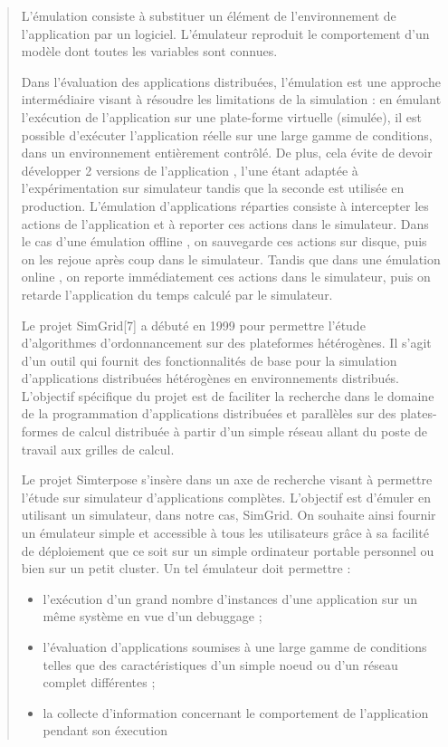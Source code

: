 \documentclass{article}
\begin{document}
\begin{quotation}
L’émulation consiste à substituer un élément de l’environnement de l’application
par un logiciel. L’émulateur reproduit le comportement d’un modèle dont toutes
les variables sont connues.

Dans l’évaluation des applications distribuées, l’émulation est une approche
intermédiaire visant à résoudre les limitations de la simulation : {\color{red}
  en émulant l’exécution de l’application sur une plate-forme virtuelle
  (simulée), il est possible d’exécuter l’application réelle sur une large gamme
  de conditions, dans un environnement entièrement contrôlé.} De plus, cela
évite de devoir développer 2 versions de l’application , l’une étant adaptée à
l’expérimentation sur simulateur tandis que la seconde est utilisée en
production. L’émulation d’applications réparties consiste à intercepter les
actions de l’application et à reporter ces actions dans le simulateur.  Dans le
cas d’une émulation offline , on sauvegarde ces actions sur disque, puis on les
rejoue après coup dans le simulateur. Tandis que dans une émulation online , on
reporte immédiatement ces actions dans le simulateur, puis on retarde
l’application du temps calculé par le simulateur.

{\color{green} Le projet SimGrid[7] a débuté en 1999 pour permettre l’étude
  d’algorithmes d’ordonnancement sur des plateformes hétérogènes. Il s’agit d’un
  outil qui fournit des fonctionnalités de base pour la simulation
  d’applications distribuées hétérogènes en environnements distribués.
  L’objectif spécifique du projet est de faciliter la recherche dans le domaine
  de la programmation d’applications distribuées et parallèles sur des
  plates-formes de calcul distribuée à partir d’un simple réseau allant du poste
  de travail aux grilles de calcul.

Le projet Simterpose s’insère dans un axe de recherche visant à permettre
l’étude sur simulateur d’applications complètes. L’objectif est d’émuler en
utilisant un simulateur, dans notre cas, SimGrid. On souhaite ainsi fournir un
émulateur simple et accessible à tous les utilisateurs grâce à sa facilité de
déploiement que ce soit sur un simple ordinateur portable personnel ou bien sur
un petit cluster. Un tel émulateur doit permettre :
\begin{itemize}
\item l'exécution d’un grand nombre d’instances d’une application sur un même
  système en vue d’un debuggage ;
\item l’évaluation d’applications soumises à une large gamme de conditions
  telles que des caractéristiques d’un simple noeud ou d’un réseau complet
  différentes ;
\item la collecte d’information concernant le comportement de l’application
  pendant son éxecution
\end{itemize}
}
\end{quotation}
\end{document}

